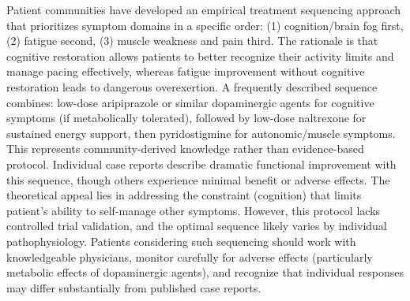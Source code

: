 \begin{observation}
\label{obs:brain-first-sequence}
Patient communities have developed an empirical treatment sequencing approach that prioritizes symptom domains in a specific order: (1) cognition/brain fog first, (2) fatigue second, (3) muscle weakness and pain third. The rationale is that cognitive restoration allows patients to better recognize their activity limits and manage pacing effectively, whereas fatigue improvement without cognitive restoration leads to dangerous overexertion. A frequently described sequence combines: low-dose aripiprazole or similar dopaminergic agents for cognitive symptoms (if metabolically tolerated), followed by low-dose naltrexone for sustained energy support, then pyridostigmine for autonomic/muscle symptoms. This represents community-derived knowledge rather than evidence-based protocol. Individual case reports describe dramatic functional improvement with this sequence, though others experience minimal benefit or adverse effects. The theoretical appeal lies in addressing the constraint (cognition) that limits patient's ability to self-manage other symptoms. However, this protocol lacks controlled trial validation, and the optimal sequence likely varies by individual pathophysiology. Patients considering such sequencing should work with knowledgeable physicians, monitor carefully for adverse effects (particularly metabolic effects of dopaminergic agents), and recognize that individual responses may differ substantially from published case reports.
\end{observation}

